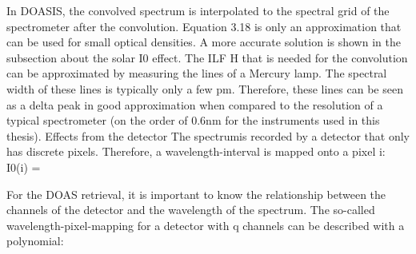 \documentclass  [
  paper    = a4,
  BCOR     = 10mm,
  twoside,
  fontsize = 12pt,
  fleqn,
  toc      = bibnumbered,
  toc      = listofnumbered,
  numbers  = noendperiod,
  headings = normal,
  listof   = leveldown,
  version  = 3.03
]                                       {scrreprt}
\begin{document}
	In DOASIS, the convolved spectrum is interpolated to the spectral grid of the
	spectrometer after the convolution. Equation 3.18 is only an approximation that
	can be used for small optical densities. A more accurate solution is shown in the
	subsection about the solar I0 effect.
	The ILF H that is needed for the convolution can be approximated by
	measuring the lines of a Mercury lamp. The spectral width of these lines is typically only a few pm. Therefore, these lines can be seen as a delta peak in
	good approximation when compared to the resolution of a typical spectrometer
	(on the order of 0.6nm for the instruments used in this thesis).
	Effects from the detector
	The spectrumis recorded by a detector that only has discrete pixels. Therefore,
	a wavelength-interval is mapped onto a pixel i:
	I0(i) =

	For the DOAS retrieval, it is important to know the relationship between the
	channels of the detector and the wavelength of the spectrum. The so-called
	wavelength-pixel-mapping for a detector with q channels can be described with
	a polynomial:
\end{document}
